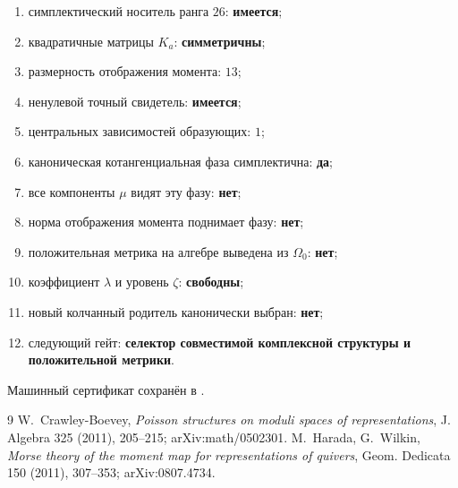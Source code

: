 \begin{protocol}
\begin{enumerate}
 \item симплектический носитель ранга $26$: \textbf{имеется};
 \item квадратичные матрицы $K_a$: \textbf{симметричны};
 \item размерность отображения момента: \textbf{$13$};
 \item ненулевой точный свидетель: \textbf{имеется};
 \item центральных зависимостей образующих: \textbf{$1$};
 \item каноническая котангенциальная фаза симплектична: \textbf{да};
 \item все компоненты $\mu$ видят эту фазу: \textbf{нет};
 \item норма отображения момента поднимает фазу: \textbf{нет};
 \item положительная метрика на алгебре выведена из $\Omega_0$: \textbf{нет};
 \item коэффициент $\lambda$ и уровень $\zeta$: \textbf{свободны};
 \item новый колчанный родитель канонически выбран: \textbf{нет};
 \item следующий гейт: \textbf{селектор совместимой комплексной структуры
 и положительной метрики}.
\end{enumerate}
\end{protocol}

Машинный сертификат сохранён в
.

\begin{thebibliography}{9}
W.~Crawley-Boevey,
\emph{Poisson structures on moduli spaces of representations},
J. Algebra 325 (2011), 205--215; arXiv:math/0502301.
M.~Harada, G.~Wilkin,
\emph{Morse theory of the moment map for representations of quivers},
Geom. Dedicata 150 (2011), 307--353; arXiv:0807.4734.
\end{thebibliography}